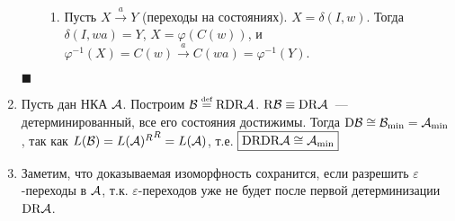 \documentclass[a4paper]{article}
\def\A{{\cal A}}
\def\B{{\cal B}}
\def\eqdef{\overset{\mbox{\tiny def}}{=}}
\def\D{{\mathrm{D}}}
\def\R{{\mathrm{R}}}
\begin{document}
\begin{enumerate}
\begin{enumerate}
\begin{enumerate}
\item Пусть $X\overset{a}{\to}Y$ (переходы на состояниях).\newline
$X=\delta(I,w)$. Тогда $\delta(I,wa)=Y$, $X=\varphi(C(w))$, и $\varphi^{-1}(X)=C(w)\overset{a}{\to}C(wa)=\varphi^{-1}(Y)$.
\end{enumerate}
\end{enumerate}
$\blacksquare$
\item Пусть дан НКА $\A$. Построим $\B\eqdef\R\D\R\A$. $\R\B\equiv\D\R\A$~--- детерминированный, все его состояния достижимы. Тогда $\D\B\cong\B_{\min}=\A_{\min}$, так как $L(\B)={L(\A)^{R}}^{R}=L(\A)$, т.е. $\boxed{\D\R\D\R\A\cong\A_{\min}}$
\item Заметим, что доказываемая изоморфность сохранится, если разрешить $\varepsilon$-переходы в $\A$, т.к. $\varepsilon$-переходов уже не будет после первой детерминизации $\D\R\A$.
\end{enumerate}
\end{document}
